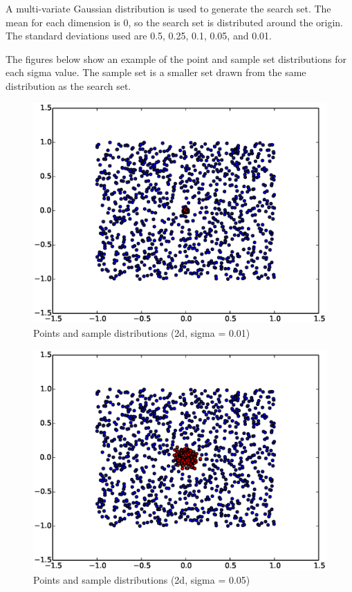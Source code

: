 \documentclass[mcs]{scsthesis}
\begin{document}
A multi-variate Gaussian distribution is used to generate the search set. The
mean for each dimension is 0, so the search set is distributed around the
origin. The standard deviations used are 0.5, 0.25, 0.1, 0.05, and 0.01.

The figures below show an example of the point and sample set distributions for
each sigma value. The sample set is a smaller set drawn from the same
distribution as the search set.

\begin{figure}
\begin{center}
\includegraphics[scale=0.5]{diagrams/pts_plot_sigma0.01.eps}
\caption{Points and sample distributions (2d, sigma = 0.01)}
\label{fig:points_and_sample_2d_0_01}
\end{center}
\end{figure}

\begin{figure}
\begin{center}
\includegraphics[scale=0.5]{diagrams/pts_plot_sigma0.05.eps}
\caption{Points and sample distributions (2d, sigma = 0.05)}
\label{fig:points_and_sample_2d_0_05}
\end{center}
\end{figure}
\end{document}
